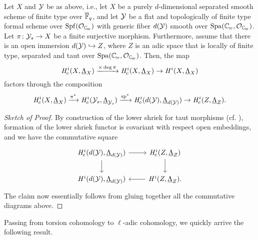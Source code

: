 \documentclass[../main.tex]{subfiles}
\begin{document}
\begin{prop}\label{thm:SubspaceInjectionFiniteLevel}
  Let $X$ and $\mathcal{Y}$ be as above, i.e., let $X$ be a purely $d$-dimensional
  separated smooth scheme of finite type over ${\overline {\mathbb{F}}_q}$, and let 
  $\mathcal{Y}$ be a flat and topologically of finite type formal scheme over
  $\Spf(\cO_\Cp)$ with generic fiber $d(\mathcal{Y})$ smooth over $\spa(\Cp,\cO_\Cp)$.
  Let $\pi\colon \mathcal{Y}_s \to X$ be a finite surjective morphism.
  Furthermore, assume that there is an open immersion
  $d(\mathcal{Y}) \hookrightarrow Z$, where
  $Z$ is an adic space that is locally of finite type, separated and taut
  over $\spa(\Cp, \cO_\Cp)$.
  Then, the map 
  \begin{equation*}
    \mathit H_{\mathrm{c}}^i(X, \underline \Lambda_X) \xrightarrow{\times \deg \pi} 
    \mathit H_{\mathrm{c}}^i(X, \underline \Lambda_X) \to 
    \mathit H^i(X,   \underline \Lambda_X)
  \end{equation*}
  factors through the composition
  \begin{equation*}
    \mathit H_{\mathrm{c}}^i(X,      \underline \Lambda_X) \xrightarrow{\pi^*}
    \mathit H_{\mathrm{c}}^i(\mathcal{Y}_s,  \underline \Lambda_{\mathcal{Y}_s}) \xrightarrow{\mathrm{sp}^*}
    \mathit H_{\mathrm{c}}^i(d(\mathcal{Y}), \underline \Lambda_{d(\mathcal{Y})}) \to 
    \mathit H_{\mathrm{c}}^i(Z,      \underline \Lambda_Z).
  \end{equation*}
\begin{proof}[Sketch of Proof]
  By construction of the lower shriek for taut morphisms (cf. \cite[Section 0.4
  D)]{huber2013etale}), formation of the lower shriek functor is covariant with
  respect open embeddings, and we have the commutative square
  \begin{equation*}
    \begin{tikzcd}[ampersand replacement=\&]
      {\hHc^i(d(\cY), \underline \Lambda_{d(\cY)})} \& 
      {\hHc^i(Z, \underline \Lambda_{Z})} \\
    	{\hH^i(d(\cY), \underline \Lambda_{d(\cY)})} \& 
      {\hH^i(Z, \underline \Lambda_{Z})}.
    	\arrow[from=1-1, to=1-2]
    	\arrow[from=1-1, to=2-1]
    	\arrow[from=1-2, to=2-2]
    	\arrow[from=2-2, to=2-1]
    \end{tikzcd}
  \end{equation*}
  The claim now essentially follows from gluing together all the commutative
  diagrams above. 
\end{proof}
\end{prop}

Passing from torsion cohomology to $\ell$-adic cohomology, we quickly arrive
the following result.
\end{document}
